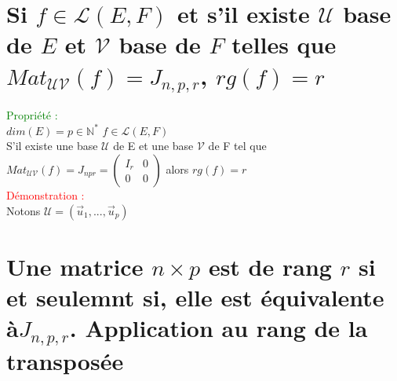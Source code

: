 \documentclass{article}
\begin{document}
        \section{Si $f \in \mathcal L(E,F)$ et s'il existe $\mathcal U$ base de $E$ et $\mathcal V$ base de $F$ telles que $Mat_{\mathcal{UV}}(f)=J_{n,p,r}$, $rg(f)=r$}
				\textcolor{green}{Propriété :} \\
				$dim(E)=p \in \mathbb N^*$ $f \in \mathcal L(E,F)$ \\
				S'il existe une base $\mathcal U$ de E et une base $\mathcal V$ de F tel que $Mat_{\mathcal{UV}}(f)=J_{npr}=\left(\begin{array}{c|c}I _r& 0 \\ \hline0 & 0 \end{array}\right)$ alors $rg(f)=r$ \\
				\textcolor{red}{Démonstration :} \\
				Notons $\mathcal U= (\vec u_1,...,\vec u_p)$
        \section{Une matrice $n \times p$ est de rang $r$ si et seulemnt si, elle est équivalente à$J_{n,p,r}$. Application au rang de la transposée}
\end{document}
